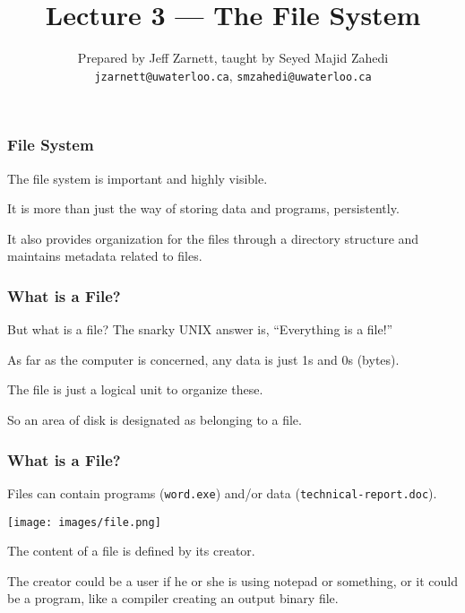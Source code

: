 

\title{Lecture 3 --- The File System }

\author{Prepared by Jeff Zarnett, taught by Seyed Majid Zahedi \\ \small \texttt{jzarnett@uwaterloo.ca}, \texttt{smzahedi@uwaterloo.ca}}
\date{}




\begin{frame}
	\titlepage

\end{frame}



\begin{frame}
	\frametitle{File System}

	The file system is important and highly visible.

	It is more than just the way of storing data and programs, persistently.

	It also provides organization for the files through a directory structure and maintains metadata related to files.

\end{frame}

\begin{frame}
	\frametitle{What is a File?}

	But what is a file? The snarky UNIX answer is, ``Everything is a file!''

	As far as the computer is concerned, any data is just 1s and 0s (bytes).

	The file is just a logical unit to organize these.

	So an area of disk is designated as belonging to a file.

\end{frame}

\begin{frame}
	\frametitle{What is a File?}

	Files can contain programs (\texttt{word.exe}) and/or data (\texttt{technical-report.doc}).

	\begin{center}
		\texttt{[image: images/file.png]}
	\end{center}

	The content of a file is defined by its creator.

	The creator could be a user if he or she is using notepad or something, or it could be a program, like a compiler creating an output binary file.

\end{frame}

